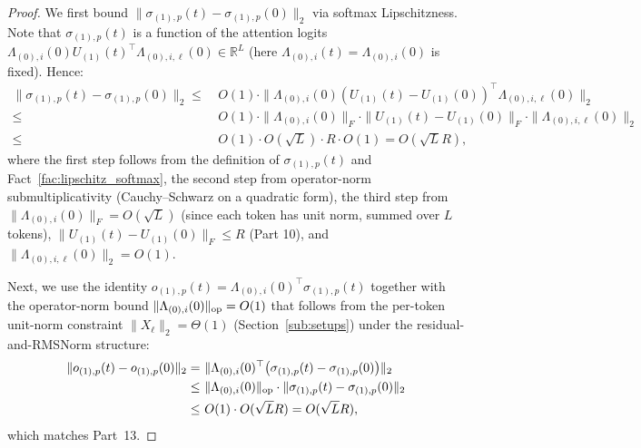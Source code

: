 \documentclass[11pt]{article}
\theoremstyle{plain}
\newcommand{\R}{\mathbb{R}}
\begin{document}
\begin{proof}
    We first bound $\|\sigma_{(1),p}(t)-\sigma_{(1),p}(0)\|_2$ via softmax Lipschitzness. Note that $\sigma_{(1),p}(t)$ is a function of the attention logits $\Lambda_{(0), i}(0) U_{(1)}(t)^\top \Lambda_{(0), i, \ell}(0) \in \R^L$ (here $\Lambda_{(0), i}(t)=\Lambda_{(0), i}(0)$ is fixed). Hence:
    \begin{align*}
        \| \sigma_{(1), p}(t) - \sigma_{(1), p}(0) \|_2
        \leq & ~ O(1) \cdot \| \Lambda_{(0), i}(0) ( U_{(1)}(t) - U_{(1)}(0) )^\top \Lambda_{(0), i, \ell}(0) \|_2 \\
        \leq & ~ O(1) \cdot \|\Lambda_{(0), i}(0)\|_F \cdot \| U_{(1)}(t) - U_{(1)}(0) \|_F \cdot \| \Lambda_{(0), i, \ell}(0) \|_2 \\
        \leq & ~ O(1) \cdot O(\sqrt{L}) \cdot R \cdot O(1) = O(\sqrt{L}R),
    \end{align*}
    where the first step follows from the definition of $\sigma_{(1), p}(t)$ and Fact~\ref{fac:lipschitz_softmax}, the second step from operator-norm submultiplicativity (Cauchy--Schwarz on a quadratic form), the third step from $\|\Lambda_{(0), i}(0)\|_F = O(\sqrt{L})$ (since each token has unit norm, summed over $L$ tokens), $\|U_{(1)}(t) - U_{(1)}(0)\|_F \le R$ (Part 10), and $\|\Lambda_{(0), i, \ell}(0)\|_2 = O(1)$.

    Next, we use the identity $o_{(1),p}(t) = \Lambda_{(0), i}(0)^\top \sigma_{(1), p}(t)$ together with the operator-norm bound $\|\Lambda_{(0),i}(0)\|_{\rm op} = O(1)$ that follows from the per-token unit-norm constraint $\|X_\ell\|_2 = \Theta(1)$ (Section~\ref{sub:setups}) under the residual-and-RMSNorm structure:
    \begin{align*}
        \| o_{(1), p}(t) - o_{(1), p}(0) \|_2 = & ~ \| \Lambda_{(0), i}(0)^\top \big( \sigma_{(1), p}(t) - \sigma_{(1), p}(0) \big) \|_2 \\
        \leq & ~ \|\Lambda_{(0), i}(0)\|_{\rm op} \cdot \| \sigma_{(1), p}(t) - \sigma_{(1), p}(0) \|_2 \\
        \leq & ~ O(1) \cdot O(\sqrt{L}R) = O(\sqrt{L} R),
    \end{align*}
    which matches Part~13.


\end{proof}
\end{document}
